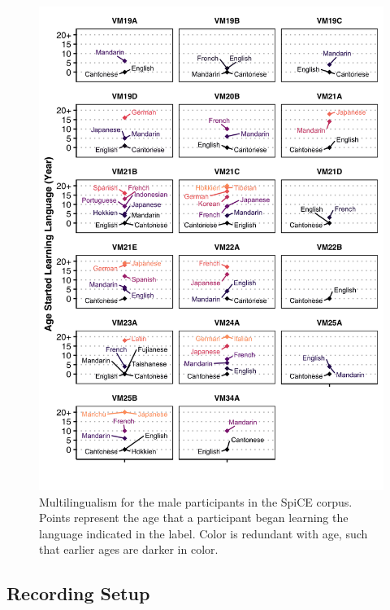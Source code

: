 \begin{figure}[!htbp]
  \begin{center}
  \includegraphics[width=4.5in]{figures/ch2_multilingualism_vm_5in.png} 
  \caption{Multilingualism for the male participants in the SpiCE corpus. Points represent the age that a participant began learning the language indicated in the label. Color is redundant with age, such that earlier ages are darker in color.}
  \label{ch2:fig:multilingualism_vm}
  \end{center}
\end{figure}

\subsection{Recording Setup}\label{ch2:subsec:setup}

